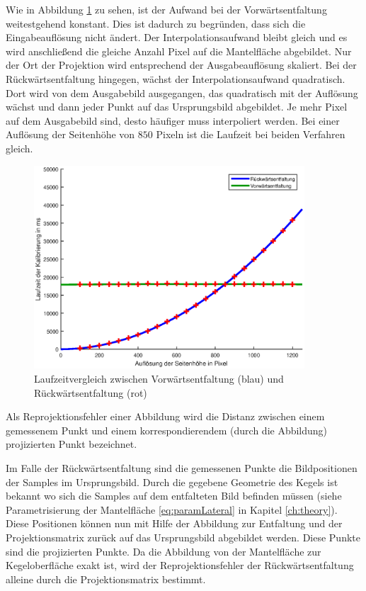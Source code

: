 Wie in Abbildung \ref{fig:runningTimeComparision} zu sehen, ist der Aufwand bei der Vorwärtsentfaltung weitestgehend konstant. Dies ist dadurch zu begründen, dass sich die Eingabeauflösung nicht ändert. Der Interpolationsaufwand bleibt gleich und es wird anschließend die gleiche Anzahl Pixel auf die Mantelfläche abgebildet. Nur der Ort der Projektion wird entsprechend der Ausgabeauflösung skaliert.
Bei der Rückwärtsentfaltung hingegen, wächst der Interpolationsaufwand quadratisch. Dort wird von dem Ausgabebild ausgegangen, das quadratisch mit der Auflösung wächst und dann jeder Punkt auf das Ursprungsbild abgebildet. Je mehr Pixel auf dem Ausgabebild sind, desto häufiger muss interpoliert werden. Bei einer Auflösung der Seitenhöhe von $850$ Pixeln ist die Laufzeit bei beiden Verfahren gleich.

\begin{figure}[!htb]
	\centering
	\includegraphics[width=0.9\textwidth]{images/runningTimeCalibration.eps}
	\caption{Laufzeitvergleich zwischen Vorwärtsentfaltung (blau) und Rückwärtsentfaltung (rot)}
	\label{fig:runningTimeComparision}
\end{figure}


\bigskip

Als Reprojektionsfehler einer Abbildung wird die Distanz zwischen einem gemessenem Punkt und einem korrespondierendem (durch die Abbildung) projizierten Punkt bezeichnet.


Im Falle der Rückwärtsentfaltung sind die gemessenen Punkte die Bildpositionen der Samples im Ursprungsbild. Durch die gegebene Geometrie des Kegels ist bekannt wo sich die Samples auf dem entfalteten Bild befinden müssen (siehe Parametrisierung der Mantelfläche \ref{eq:paramLateral} in Kapitel \ref{ch:theory}). Diese Positionen können nun mit Hilfe der Abbildung zur Entfaltung und der Projektionsmatrix zurück auf das Ursprungsbild abgebildet werden. Diese Punkte sind die projizierten Punkte. Da die Abbildung von der Mantelfläche zur Kegeloberfläche exakt ist, wird der Reprojektionsfehler der Rückwärtsentfaltung alleine durch die Projektionsmatrix bestimmt.


